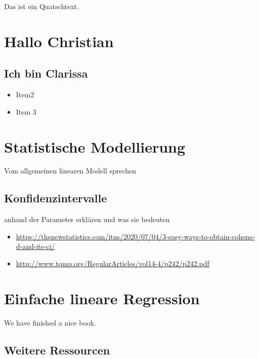 \documentclass[
]{book}
\providecommand{\tightlist}{%
  \setlength{\itemsep}{0pt}\setlength{\parskip}{0pt}}
\begin{document}
Das ist ein Quatschtext.

\hypertarget{hallo-christian}{%
\chapter{Hallo Christian}\label{hallo-christian}}

\hypertarget{ich-bin-clarissa}{%
\section{Ich bin Clarissa}\label{ich-bin-clarissa}}

\begin{itemize}
\tightlist
\item
  Item2
\item
  Item 3
\end{itemize}

\hypertarget{statistische-modellierung}{%
\chapter{Statistische Modellierung}\label{statistische-modellierung}}

Vom allgemeinen linearen Modell sprechen

\hypertarget{konfidenzintervalle}{%
\section{Konfidenzintervalle}\label{konfidenzintervalle}}

anhand der Parameter erklären und was sie bedeuten

\begin{itemize}
\tightlist
\item
  \url{https://thenewstatistics.com/itns/2020/07/04/3-easy-ways-to-obtain-cohens-d-and-its-ci/}
\item
  \url{http://www.tqmp.org/RegularArticles/vol14-4/p242/p242.pdf}
\end{itemize}

\hypertarget{einfache-lineare-regression}{%
\chapter{Einfache lineare Regression}\label{einfache-lineare-regression}}

We have finished a nice book.

\hypertarget{weitere-ressourcen}{%
\section{Weitere Ressourcen}\label{weitere-ressourcen}}
\end{document}
